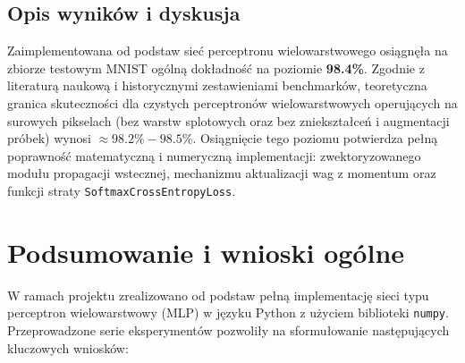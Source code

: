 \documentclass[11pt,a4paper]{article}
\begin{document}
\subsection{Opis wyników i dyskusja}
    Zaimplementowana od podstaw sieć perceptronu wielowarstwowego osiągnęła na zbiorze testowym MNIST ogólną dokładność na poziomie \textbf{98.4\%}. Zgodnie z literaturą naukową i historycznymi zestawieniami benchmarków, teoretyczna granica skuteczności dla czystych perceptronów wielowarstwowych operujących na surowych pikselach (bez warstw splotowych oraz bez zniekształceń i augmentacji próbek) wynosi $\approx 98.2\% - 98.5\%$. Osiągnięcie tego poziomu potwierdza pełną poprawność matematyczną i numeryczną implementacji: zwektoryzowanego modułu propagacji wstecznej, mechanizmu aktualizacji wag z momentum oraz funkcji straty \texttt{SoftmaxCrossEntropyLoss}.

\section{Podsumowanie i wnioski ogólne}
\label{sec:summary}

W ramach projektu zrealizowano od podstaw pełną implementację sieci typu perceptron wielowarstwowy (MLP) w języku Python z użyciem biblioteki \texttt{numpy}. Przeprowadzone serie eksperymentów pozwoliły na sformułowanie następujących kluczowych wniosków:
\end{document}
